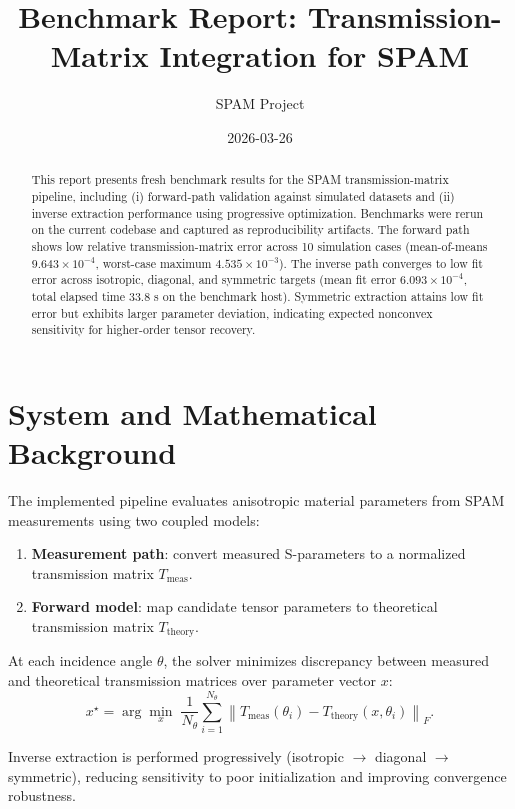 \documentclass[11pt]{article}
\title{Benchmark Report: Transmission-Matrix Integration for SPAM}
\author{SPAM Project}
\date{2026-03-26}
\begin{document}
\maketitle

\begin{abstract}
This report presents fresh benchmark results for the SPAM transmission-matrix pipeline, including (i) forward-path validation against simulated datasets and (ii) inverse extraction performance using progressive optimization. Benchmarks were rerun on the current codebase and captured as reproducibility artifacts. The forward path shows low relative transmission-matrix error across 10 simulation cases (mean-of-means \(9.643\times 10^{-4}\), worst-case maximum \(4.535\times 10^{-3}\)). The inverse path converges to low fit error across isotropic, diagonal, and symmetric targets (mean fit error \(6.093\times 10^{-4}\), total elapsed time 33.8 s on the benchmark host). Symmetric extraction attains low fit error but exhibits larger parameter deviation, indicating expected nonconvex sensitivity for higher-order tensor recovery.
\end{abstract}

\section{System and Mathematical Background}

The implemented pipeline evaluates anisotropic material parameters from SPAM measurements using two coupled models:
\begin{enumerate}
    \item \textbf{Measurement path}: convert measured S-parameters to a normalized transmission matrix \(T_{\text{meas}}\).
    \item \textbf{Forward model}: map candidate tensor parameters to theoretical transmission matrix \(T_{\text{theory}}\).
\end{enumerate}

At each incidence angle \(\theta\), the solver minimizes discrepancy between measured and theoretical transmission matrices over parameter vector \(x\):
\begin{equation}
    x^\star = \arg\min_x \; \frac{1}{N_\theta}\sum_{i=1}^{N_\theta}
    \left\| T_{\text{meas}}(\theta_i)-T_{\text{theory}}(x,\theta_i)\right\|_F .
\end{equation}

Inverse extraction is performed progressively (isotropic \(\rightarrow\) diagonal \(\rightarrow\) symmetric), reducing sensitivity to poor initialization and improving convergence robustness.
\end{document}
